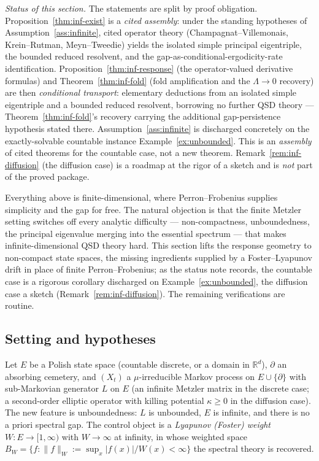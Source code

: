 \documentclass[11pt,reqno]{amsart}
\theoremstyle{plain}
\theoremstyle{definition}
\theoremstyle{remark}
\newcommand{\R}{\mathbb{R}}
\begin{document}
\emph{Status of this section.} The statements are split by proof obligation.
Proposition~\ref{thm:inf-exist} is a \emph{cited assembly}: under the standing hypotheses of
Assumption~\ref{ass:infinite}, cited operator theory (Champagnat--Villemonais, Krein--Rutman,
Meyn--Tweedie) yields the isolated simple principal eigentriple, the bounded reduced resolvent,
and the gap-as-conditional-ergodicity-rate identification. Proposition~\ref{thm:inf-response}
(the operator-valued derivative formulas) and Theorem~\ref{thm:inf-fold} (fold amplification
and the $\Lambda\to0$ recovery) are then \emph{conditional transport}: elementary deductions
from an isolated simple eigentriple and a bounded reduced resolvent, borrowing no further QSD
theory --- Theorem~\ref{thm:inf-fold}'s recovery carrying the additional gap-persistence
hypothesis stated there. Assumption~\ref{ass:infinite} is discharged concretely on the
exactly-solvable countable instance Example~\ref{ex:unbounded}. This is an \emph{assembly} of
cited theorems for the countable case, not a new theorem. Remark~\ref{rem:inf-diffusion} (the
diffusion case) is a roadmap at the rigor of a sketch and is \emph{not} part of the proved
package.

Everything above is finite-dimensional, where Perron--Frobenius supplies simplicity and the gap for
free. The natural objection is that the finite Metzler setting switches off every analytic difficulty
--- non-compactness, unboundedness, the principal eigenvalue merging into the essential spectrum ---
that makes infinite-dimensional QSD theory hard. This section lifts the response geometry to
non-compact state spaces, the missing ingredients supplied by a Foster--Lyapunov drift in place of
finite Perron--Frobenius; as the status note records, the countable case is a rigorous corollary
discharged on Example~\ref{ex:unbounded}, the diffusion case a sketch (Remark~\ref{rem:inf-diffusion}).
The remaining verifications are routine.

\subsection{Setting and hypotheses}
Let $E$ be a Polish state space (countable discrete, or a domain in $\R^d$), $\partial$
an absorbing cemetery, and $(X_t)$ a $\mu$-irreducible Markov process on
$E\cup\{\partial\}$ with sub-Markovian generator $L$ on $E$ (an infinite Metzler
matrix in the discrete case; a second-order elliptic operator with killing potential
$\kappa\ge0$ in the diffusion case). The new feature is unboundedness: $L$ is
unbounded, $E$ is infinite, and there is no a priori spectral gap. The control object
is a \emph{Lyapunov (Foster) weight} $W\colon E\to[1,\infty)$ with $W\to\infty$ at
infinity, in whose weighted space $B_W=\{f:\|f\|_W:=\sup_x|f(x)|/W(x)<\infty\}$ the
spectral theory is recovered.
\end{document}
